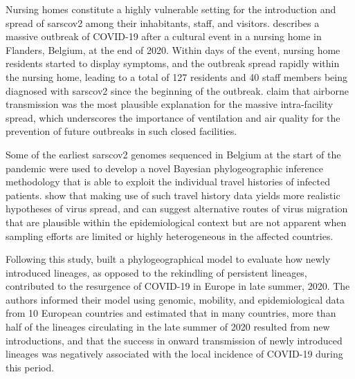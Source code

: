 Nursing homes constitute a highly vulnerable setting for the introduction and spread of \gls{sarscov2} among their inhabitants, staff, and visitors.
\citet{vuylsteke2022role} describes a massive outbreak of COVID-19 after a cultural event in a nursing home in Flanders, Belgium, at the end of 2020.
Within days of the event, nursing home residents started to display symptoms, and the outbreak spread rapidly within the nursing home, leading to a total of 127 residents and 40 staff members being diagnosed with \gls{sarscov2} since the beginning of the outbreak.
\citet{vuylsteke2022role} claim that airborne transmission was the most plausible explanation for the massive intra-facility spread, which underscores the importance of ventilation and air quality for the prevention of future outbreaks in such closed facilities.

Some of the earliest \gls{sarscov2} genomes sequenced in Belgium at the start of the pandemic were used to develop a novel Bayesian phylogeographic inference methodology that is able to exploit the individual travel histories of infected patients.
\citet{lemey2020accommodating} show that making use of such travel history data yields more realistic hypotheses of virus spread, and can suggest alternative routes of virus migration that are plausible within the epidemiological context but are not apparent when sampling efforts are limited or highly heterogeneous in the affected countries.

Following this study, \citet{lemey2021untangling} built a phylogeographical model to evaluate how newly introduced lineages, as opposed to the rekindling of persistent lineages, contributed to the resurgence of COVID-19 in Europe in late summer, 2020.
The authors informed their model using genomic, mobility, and epidemiological data from 10 European countries and estimated that in many countries, more than half of the lineages circulating in the late summer of 2020 resulted from new introductions, and that the success in onward transmission of newly introduced lineages was negatively associated with the local incidence of COVID-19 during this period.


